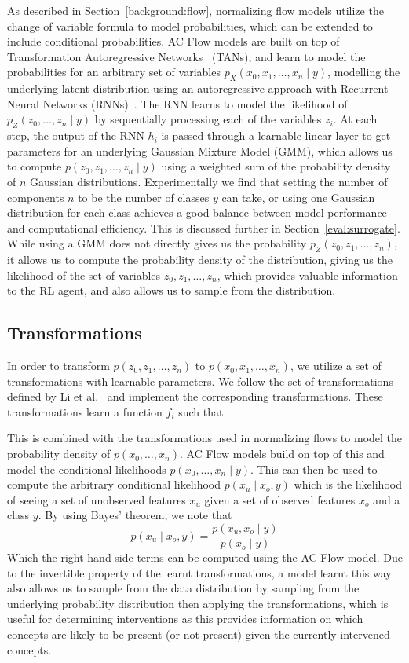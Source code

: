 \documentclass[../main.tex]{subfiles}
\begin{document}
As described in Section~\ref{background:flow}, 
normalizing flow models utilize the change of variable formula to model probabilities,
which can be extended to include conditional probabilities. AC Flow models are built on top of
Transformation Autoregressive
Networks~\cite{tans} (TANs), and learn to model 
the probabilities for an arbitrary set of variables $p_X(x_0, x_1, \ldots, x_n \mid y)$,
modelling the underlying latent distribution using an autoregressive approach with Recurrent
Neural Networks (RNNs)~\cite{rnn}. The RNN learns to model the likelihood of 
$p_Z(z_0, \ldots, z_n \mid y)$ by sequentially processing each of the variables $z_i$.
At each step, the output of the RNN $h_i$ is 
passed through a learnable linear layer to get parameters for an underlying Gaussian Mixture Model (GMM),
which allows us to compute $p(z_0, z_1, \ldots, z_n \mid y)$ using a weighted
sum of the probability density of $n$ Gaussian distributions. Experimentally
we find that setting the number of components $n$ to be the number of classes 
$y$ can take, or using one Gaussian distribution for each class 
achieves
a good balance between model performance and computational efficiency.
This is discussed further in Section~\ref{eval:surrogate}.
While using a GMM does not directly gives us the probability
$p_Z(z_0, z_1, \ldots, z_n)$, it allows us to compute the probability density of the distribution, giving 
us the likelihood of the set of variables $z_0, z_1, \ldots, z_n$, which provides valuable information
to the RL agent, and also allows us to sample from the distribution.

\subsection{Transformations}

In order to transform $p(z_0, z_1, \ldots, z_n)$ to $p(x_0, x_1, \ldots, x_n)$, we
utilize a set of transformations with learnable parameters. We follow the 
set of transformations defined by Li et al.~\cite{acflow} and implement the corresponding
transformations. These transformations learn a function $f_i$ such that



This is combined with the transformations used in normalizing flows to 
model the probability density of $p(x_0, \ldots, x_n)$. 
AC Flow models
build on top of this and model the conditional likelihoods $p(x_0, \ldots, x_n \mid y)$.
This can then be used to compute the arbitrary conditional likelihood $p(x_u \mid x_o, y)$
which is the likelihood of 
seeing a set of unobserved features $x_u$
given a set of observed features $x_o$ and a class $y$. 
By using Bayes' theorem, we note that
\[p(x_u \mid x_o, y) = \frac{p(x_u, x_o \mid y)}{p(x_o \mid y)}\]
Which the right hand side terms can be computed using the AC Flow model.
Due to the invertible property of the learnt transformations,
a model learnt this way also allows us to sample from the data distribution
by sampling from the underlying probability distribution then applying the transformations, which is useful for
determining interventions as
this provides information on which concepts are likely to be present (or not present) given the currently intervened
concepts.
\end{document}
